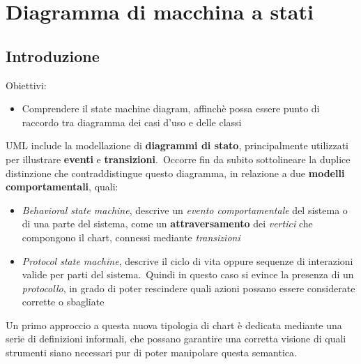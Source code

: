 \documentclass{article}
\begin{document}
\pagestyle{empty}
\section*{Diagramma di macchina a stati}
\large
\subsection*{Introduzione}
\large
Obiettivi:
\begin{itemize}[label={-}]
    \itemsep0em
    \item Comprendere il state machine diagram, affinchè possa essere punto di raccordo tra diagramma dei casi d'uso e delle classi
\end{itemize}
UML include la modellazione di \textbf{diagrammi di stato}, principalmente utilizzati per illustrare \textbf{eventi} e \textbf{transizioni}.\ Occorre fin da subito sottolineare la duplice distinzione che contraddistingue questo diagramma, in relazione a due \textbf{modelli comportamentali}, quali:
\begin{itemize}[label={-}]
    \itemsep0em
    \item \textit{Behavioral state machine}, descrive un \textit{evento comportamentale} del sistema o di una parte del sistema, come un \textbf{attraversamento} dei \textit{vertici} che compongono il chart, connessi mediante \textit{transizioni} 
    \item \textit{Protocol state machine}, descrive il ciclo di vita oppure sequenze di interazioni valide per parti del sistema.\ Quindi in questo caso si evince la presenza di un \textit{protocollo}, in grado di poter rescindere quali azioni possano essere considerate corrette o sbagliate
\end{itemize}
Un primo approccio a questa nuova tipologia di chart è dedicata mediante una serie di definizioni informali, che possano garantire una corretta visione di quali strumenti siano necessari pur di poter manipolare questa semantica.
\end{document}
